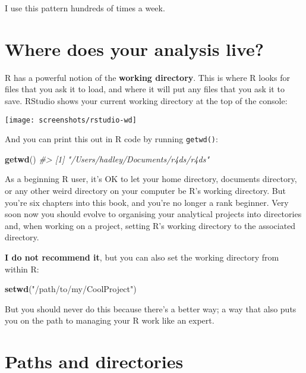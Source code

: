 \documentclass[]{book}
\newenvironment{Shaded}{\begin{snugshade}}{\end{snugshade}}
\newcommand{\KeywordTok}[1]{\textcolor[rgb]{0.13,0.29,0.53}{\textbf{{#1}}}}
\newcommand{\StringTok}[1]{\textcolor[rgb]{0.31,0.60,0.02}{{#1}}}
\newcommand{\CommentTok}[1]{\textcolor[rgb]{0.56,0.35,0.01}{\textit{{#1}}}}
\newcommand{\NormalTok}[1]{{#1}}
\begin{document}
I use this pattern hundreds of times a week.

\section{Where does your analysis
live?}\label{where-does-your-analysis-live}

R has a powerful notion of the \textbf{working directory}. This is where
R looks for files that you ask it to load, and where it will put any
files that you ask it to save. RStudio shows your current working
directory at the top of the console:

\begin{center}\texttt{[image: screenshots/rstudio-wd]} \end{center}

And you can print this out in R code by running \texttt{getwd()}:

\begin{Shaded}
\begin{Highlighting}[]
\KeywordTok{getwd}\NormalTok{()}
\CommentTok{#> [1] "/Users/hadley/Documents/r4ds/r4ds"}
\end{Highlighting}
\end{Shaded}

As a beginning R user, it's OK to let your home directory, documents
directory, or any other weird directory on your computer be R's working
directory. But you're six chapters into this book, and you're no longer
a rank beginner. Very soon now you should evolve to organising your
analytical projects into directories and, when working on a project,
setting R's working directory to the associated directory.

\textbf{I do not recommend it}, but you can also set the working
directory from within R:

\begin{Shaded}
\begin{Highlighting}[]
\KeywordTok{setwd}\NormalTok{(}\StringTok{"/path/to/my/CoolProject"}\NormalTok{)}
\end{Highlighting}
\end{Shaded}

But you should never do this because there's a better way; a way that
also puts you on the path to managing your R work like an expert.

\section{Paths and directories}\label{paths-and-directories}
\end{document}
